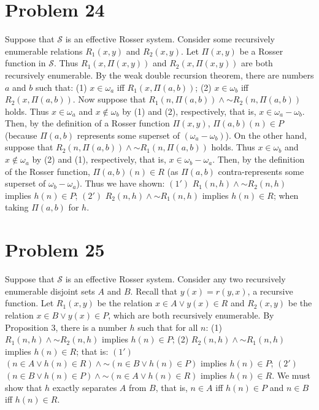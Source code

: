 \documentclass{article}
\newcommand*{\oldneg}{\mathord{\sim}}
\theoremstyle{definition}
\begin{document}
\section*{Problem 24}
Suppose that $\mathcal{S}$ is an effective Rosser system. Consider some recursively enumerable relations $R_1(x,y)$ and $R_2(x,y)$. Let $\Pi(x,y)$ be a Rosser function in $\mathcal{S}$. 
Thus $R_1(x,\Pi(x,y))$ and $R_2(x,\Pi(x,y))$ are both recursively enumerable. By the weak double recursion theorem, there are numbers $a$ and $b$ such that:\newline
(1) $x\in\omega_a$ iff $R_1(x,\Pi(a,b))$;\newline
(2) $x\in\omega_b$ iff $R_2(x,\Pi(a,b))$.\newline
Now suppose that $R_1(n,\Pi(a,b))\wedge\oldneg R_2(n,\Pi(a,b))$ holds. Thus $x\in\omega_a$ and $x\notin\omega_b$ by (1) and (2), respectively, that is, $x\in\omega_a-\omega_b$. Then, by the 
definition of a Rosser function $\Pi(x,y)$, $\Pi(a,b)(n)\in P$ (because $\Pi(a,b)$ represents some superset of $(\omega_a-\omega_b)$). 
On the other hand, suppose that $R_2(n,\Pi(a,b))\wedge\oldneg R_1(n,\Pi(a,b))$ holds. 
Thus $x\in\omega_b$ and $x\notin\omega_a$ by (2) and (1), respectively, that is, $x\in\omega_b-\omega_a$. Then, by the definition of the Rosser function, $\Pi(a,b)(n)\in R$ (as $\Pi(a,b)$ 
contra-represents some superset of $\omega_b-\omega_a$). Thus we have shown:\newline
$(1')$ $R_1(n,h)\wedge\oldneg R_2(n,h)$ implies $h(n)\in P$;\newline
$(2')$ $R_2(n,h)\wedge\oldneg R_1(n,h)$ implies $h(n)\in R$;\newline
when taking $\Pi(a,b)$ for $h$. 

\section*{Problem 25}
Suppose that $\mathcal{S}$ is an effective Rosser system. Consider any two recursively enumerable disjoint sets $A$ and $B$. Recall that $y(x)=r(y,x)$, a recursive function. 
Let $R_1(x,y)$ be the relation $x\in A\vee y(x)\in R$ and $R_2(x,y)$ be the relation $x\in B\vee y(x)\in P$, which are both recursively enumerable. By Proposition 3, there is a number 
$h$ such that for all $n$:\newline
(1) $R_1(n,h)\wedge\oldneg R_2(n,h)$ implies $h(n)\in P$;\newline
(2) $R_2(n,h)\wedge\oldneg R_1(n,h)$ implies $h(n)\in R$;\newline
that is:\newline
$(1')$ $(n\in A\vee h(n)\in R)\wedge\oldneg (n\in B\vee h(n)\in P)$ implies $h(n)\in P$;\newline
$(2')$ $(n\in B\vee h(n)\in P)\wedge\oldneg (n\in A\vee h(n)\in R)$ implies $h(n)\in R$.\newline
We must show that $h$ exactly separates $A$ from $B$, that is, $n\in A$ iff $h(n)\in P$ and $n\in B$ iff $h(n)\in R$. 
\end{document}
